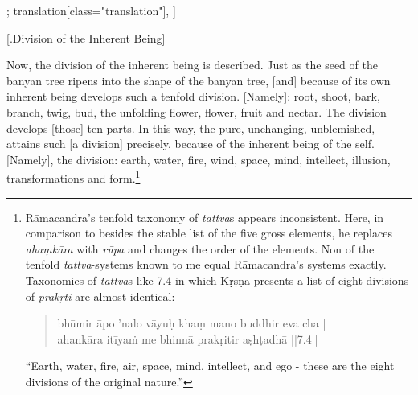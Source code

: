 \begin{alignment}[
  texts=edition[class="edition"];
  translation[class="translation"],
  ]
  \begin{translation}
 \centerline{\textrm{\small{[.\textsuperscript{}Division of the Inherent Being]}}}
          \bigskip
          \begin{tlate}
             Now, the division of the inherent being is described. Just as the seed of the banyan tree ripens into the shape of the banyan tree, [and] because of its own inherent being develops such a tenfold division. [Namely]: root, shoot, bark, branch, twig, bud, the unfolding flower, flower, fruit and nectar. The division develops [those] ten parts. In this way, the pure, unchanging, unblemished, attains such [a division] precisely, because of the inherent being of the self. [Namely], the division: earth, water, fire, wind, space, mind, intellect, illusion, transformations and form.\footnote{Rāmacandra's tenfold taxonomy of \textit{tattva}s appears inconsistent. Here, in comparison to \textsuperscript{} besides the stable list of the five gross elements, he replaces \textit{ahaṃkāra} with \textit{rūpa} and changes the order of the elements. Non of the tenfold \textit{tattva}-systems known to me equal Rāmacandra's systems exactly. Taxonomies of \textit{tattva}s like  7.4 in which Kṛṣṇa presents a list of eight divisions of \textit{prakṛti} are almost identical: \begin{quote} bhūmir āpo ’nalo vāyuḥ khaṃ mano buddhir eva cha |\\ahankāra itīyaṁ me bhinnā prakṛitir aṣhṭadhā ||7.4||\end{quote} ``Earth, water, fire, air, space, mind, intellect, and ego - these are the eight divisions of the original nature.''\vfill
}
\end{tlate}
\end{translation}
\end{alignment}

